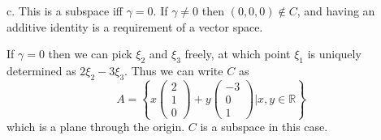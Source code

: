 \documentclass{article}
\newcommand{\chapternumber}{2}
\newenvironment{QandA}{\begin{enumerate}[label=\chapternumber.\arabic*]\bfseries\boldmath}
	{\end{enumerate}}
\newenvironment{answered}{\par\bigskip\normalfont\unboldmath}{}
\begin{document}
\begin{QandA}
\begin{answered}
			c. This is a subspace iff $\gamma=0$. If $\gamma\neq0$ then $(0,0,0)\notin C$, and having an additive identity is a requirement of a vector space.
			
			If $\gamma=0$ then we can pick $\xi_2$ and $\xi_3$ freely, at which point $\xi_1$ is uniquely determined as $2\xi_2-3\xi_3$. Thus we can write $C$ as
			\[A = \left\{
			x\begin{pmatrix}
				2 \\ 1 \\ 0
			\end{pmatrix}
			+			
			y\begin{pmatrix}
				-3 \\ 0 \\ 1
			\end{pmatrix}
			|x,y\in\mathbb{R}
			\right\}
			\]
			which is a plane through the origin. $C$ is a subspace in this case.
			

\end{answered}
\end{QandA}
\end{document}
